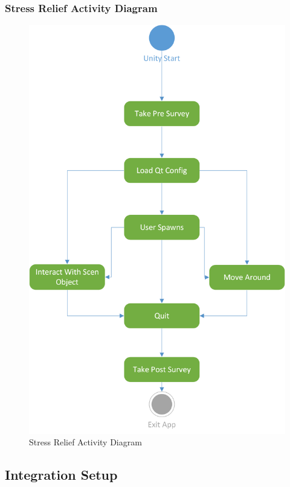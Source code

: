 \documentclass[a4paper,10pt]{article}
\begin{document}
\subsubsection{Stress Relief Activity Diagram}
\begin{figure}[H]
					\centerline{\includegraphics[scale = 0.8]{stressActivityDiag.png}}
					\caption{Stress Relief Activity Diagram}
					\label{fig:stressAct}
				\end{figure}
				\pagebreak
\subsection{Integration Setup}
\end{document}
